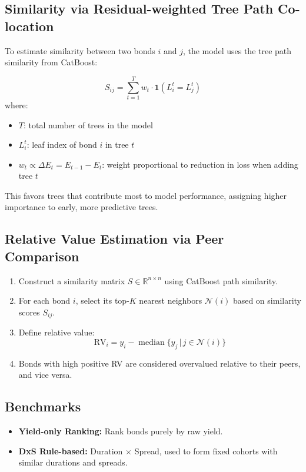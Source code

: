 \documentclass{article}
\begin{document}
\subsection*{Similarity via Residual-weighted Tree Path Co-location}
To estimate similarity between two bonds \( i \) and \( j \), the model uses the tree path similarity from CatBoost:

\[
S_{ij} = \sum_{t=1}^T w_t \cdot \mathbf{1}\left(L_i^t = L_j^t\right)
\]
where:
\begin{itemize}[nosep]
    \item \( T \): total number of trees in the model
    \item \( L_i^t \): leaf index of bond \( i \) in tree \( t \)
    \item \( w_t \propto \Delta E_t = E_{t-1} - E_t \): weight proportional to reduction in loss when adding tree \( t \)
\end{itemize}

This favors trees that contribute most to model performance, assigning higher importance to early, more predictive trees.

\subsection*{Relative Value Estimation via Peer Comparison}
\begin{enumerate}[nosep]
    \item Construct a similarity matrix \( S \in \mathbb{R}^{n \times n} \) using CatBoost path similarity.
    \item For each bond \( i \), select its top-\( K \) nearest neighbors \( \mathcal{N}(i) \) based on similarity scores \( S_{ij} \).
    \item Define relative value:
    \[
    \text{RV}_i = y_i - \operatorname{median} \{ y_j \,|\, j \in \mathcal{N}(i) \}
    \]
    \item Bonds with high positive RV are considered overvalued relative to their peers, and vice versa.
\end{enumerate}

\subsection*{Benchmarks}
\begin{itemize}[nosep]
    \item \textbf{Yield-only Ranking:} Rank bonds purely by raw yield.
    \item \textbf{DxS Rule-based:} Duration \(\times\) Spread, used to form fixed cohorts with similar durations and spreads.
\end{itemize}
\end{document}
